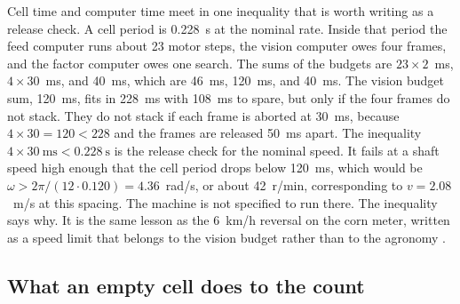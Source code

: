 Cell time and computer time meet in one inequality that is worth writing as a release check. A cell period is 0.228~s at the nominal rate. Inside that period the feed computer runs about 23 motor steps, the vision computer owes four frames, and the factor computer owes one search. The sums of the budgets are $23\times 2$~ms, $4\times 30$~ms, and 40~ms, which are 46~ms, 120~ms, and 40~ms. The vision budget sum, 120~ms, fits in 228~ms with 108~ms to spare, but only if the four frames do not stack. They do not stack if each frame is aborted at 30~ms, because $4\times 30=120<228$ and the frames are released 50~ms apart. The inequality $4\times 30~\mathrm{ms}<0.228~\mathrm{s}$ is the release check for the nominal speed. It fails at a shaft speed high enough that the cell period drops below 120~ms, which would be $\omega>2\pi/(12\cdot 0.120)=4.36$~rad/s, or about 42~r/min, corresponding to $v=2.08$~m/s at this spacing. The machine is not specified to run there. The inequality says why. It is the same lesson as the 6~km/h reversal on the corn meter, written as a speed limit that belongs to the vision budget rather than to the agronomy \cite{borja2021}.

\subsection{What an empty cell does to the count}


